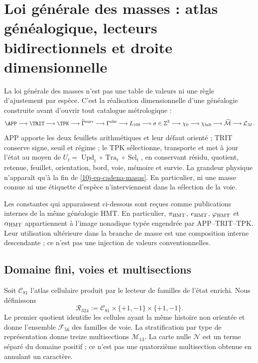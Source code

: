 \section{Loi générale des masses : atlas généalogique, lecteurs bidirectionnels et droite dimensionnelle}
\label{10j-sec-ley-general-masas}

La loi générale des masses n'est pas une table de valeurs ni une règle d'ajustement par
espèce. C'est la réalisation dimensionnelle d'une généalogie construite avant
d'ouvrir tout catalogue métrologique :
\begin{equation}
 \APP\longrightarrow\TRIT\longrightarrow\TPK
 \longrightarrow\widetilde\Gamma^{\rm surv}
 \longrightarrow\Gamma^{\rm obs}
 \longrightarrow L_{108}
 \longrightarrow\sigma\in\mathbb Z^5
 \longrightarrow\chi_0
 \longrightarrow\chi_{\rm full}
 \longrightarrow\widehat{\mathcal M}
 \longrightarrow\mathcal L_M .
 \label{10j-eq-cadena-masas}
\end{equation}
APP apporte les deux feuillets arithmétiques et leur défaut orienté ; TRIT conserve
signe, seuil et régime ; le TPK sélectionne, transporte et met à jour l'état
au moyen de
\(
 U_t=\operatorname{Upd}_t\circ\operatorname{Tra}_t\circ
 \operatorname{Sel}_t
\), en conservant résidu, quotient, retenue, feuillet, orientation, bord,
voie, mémoire et survie. La grandeur physique n'apparaît qu'à la fin
de \eqref{10j-eq-cadena-masas}. En particulier, ni une masse connue ni une
étiquette d'espèce n'interviennent dans la sélection de la voie.

Les constantes qui apparaissent ci-dessous sont reçues comme publications internes de
la même généalogie HMT. En particulier, \(\pi_{\rm HMT}\), \(e_{\rm HMT}\),
\(\varphi_{\rm HMT}\) et \(\alpha_{\rm HMT}\) appartiennent à l'image nonadique
typée engendrée par APP--TRIT--TPK. Leur utilisation ultérieure dans la branche de masse est une
composition interne descendante ; ce n'est pas une injection de valeurs
conventionnelles.

\subsection{Domaine fini, voies et multisections}

\begin{definition}
\label{10j-def-atlas}
Soit \(\mathcal C_{81}\) l'atlas cellulaire produit par le lecteur de familles
de l'état enrichi. Nous définissons
\begin{equation}
 \mathcal R_{324}:=
 \mathcal C_{81}\times\{+1,-1\}\times\{+1,-1\}.
 \label{10j-eq-rutas-324}
\end{equation}
Le premier quotient identifie les cellules ayant la même histoire non orientée et donne
l'ensemble \(\mathcal F_{56}\) des familles de voie. La stratification par
type de représentation donne treize multisections
\(\mathcal M_{13}\). La carte nulle \(\mathcal N\) est un terme séparé du
domaine positif ; ce n'est pas une quatorzième multisection obtenue en annulant
un caractère.
\end{definition}

